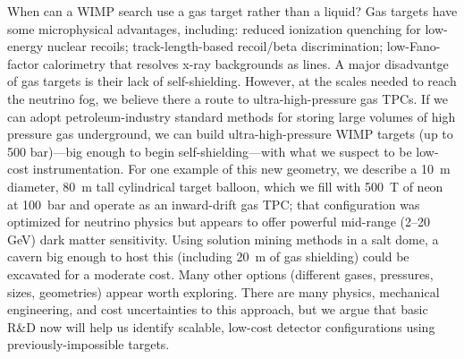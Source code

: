 When can a WIMP search use a gas target rather than a liquid?  Gas targets have some microphysical advantages, including: reduced ionization quenching for low-energy nuclear recoils; track-length-based recoil/beta discrimination; low-Fano-factor calorimetry that resolves x-ray backgrounds as lines. A major disadvantge of gas targets is their lack of self-shielding.  However, at the scales needed to reach the neutrino fog, we believe there a route to ultra-high-pressure gas TPCs.  If we can adopt petroleum-industry standard methods for storing large volumes of high pressure gas underground, we can build ultra-high-pressure WIMP targets (up to 500 bar)---big enough to begin self-shielding---with what we suspect to be low-cost instrumentation.  For one example of this new geometry, we describe a 10~m diameter, 80~m tall cylindrical target balloon, which we fill with 500~T of neon at 100~bar and operate as an inward-drift gas TPC; that configuration was optimized for neutrino physics but appears to offer powerful mid-range (2--20 GeV) dark matter sensitivity.  Using solution mining methods in a salt dome, a cavern big enough to host this (including 20~m of gas shielding) could be excavated for a moderate cost.  Many other options (different gases, pressures, sizes, geometries) appear worth exploring.  There are many physics, mechanical engineering, and cost uncertainties to this approach, but we argue that basic R\&D now will help us identify scalable, low-cost detector configurations using previously-impossible targets.
